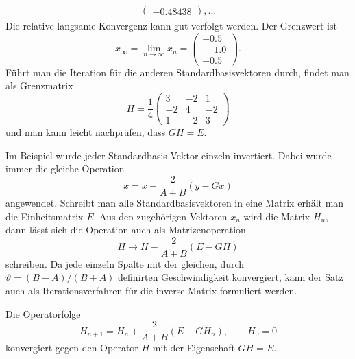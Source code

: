 \begin{beispiel}
\begin{align*}
\begin{pmatrix}
  -0.48438
\end{pmatrix},
\dots
\end{align*}
Die relative langsame Konvergenz kann gut verfolgt werden.
Der Grenzwert ist
\[
x_{\infty} = \lim_{n\to\infty}x_n = \begin{pmatrix}
-0.5\\\phantom{-}1.0\\-0.5
\end{pmatrix}.
\]
Führt man die Iteration für die anderen Standardbasisvektoren durch,
findet man als Grenzmatrix
\[
H=\frac14\begin{pmatrix}
 3&-2& 1\\
-2& 4&-2\\
 1&-2& 3
\end{pmatrix}
\]
und man kann leicht nachprüfen, dass $GH=E$.
\end{beispiel}

Im Beispiel wurde jeder Standardbasis-Vektor einzeln invertiert.
Dabei wurde immer die gleiche Operation
\[
x = x - \frac{2}{A+B}(y - Gx)
\]
angewendet.
Schreibt man alle Standardbasisvektoren in eine Matrix erhält man 
die Einheitsmatrix $E$. Aus den zugehörigen Vektoren $x_n$
wird die Matrix $H_n$, dann lässt sich die Operation auch als
Matrizenoperation
\[
H \to H - \frac{2}{A+B}(E - GH)
\]
schreiben.
Da jede einzeln Spalte mit der gleichen, durch $\vartheta = (B-A)/(B+A)$
definirten Geschwindigkeit konvergiert, kann der Satz auch als
Iterationsverfahren für die inverse Matrix formuliert werden.

\begin{satz}
Die Operatorfolge
\[
H_{n+1}
=
H_n
+
\frac{2}{A+B}
(
E-
GH_n
)
,
\qquad
H_0=0
\]
konvergiert gegen den Operator $H$ mit der Eigenschaft $GH=E$.
\end{satz}








